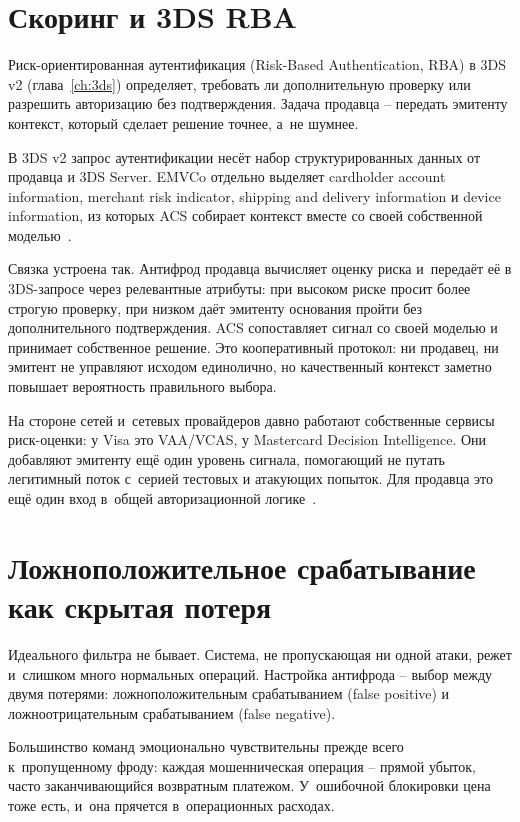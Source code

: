 \section{Скоринг и 3DS RBA}\label{sec:fraud-3ds-rba}

Риск-ориентированная аутентификация (Risk-Based Authentication, RBA)
в 3DS v2 (глава~\ref{ch:3ds}) определяет, требовать ли дополнительную
проверку или разрешить авторизацию без подтверждения. Задача
продавца -- передать эмитенту контекст, который сделает решение
точнее, а~не шумнее.

В 3DS v2 запрос аутентификации несёт набор структурированных данных
от продавца и 3DS Server.
EMVCo отдельно выделяет cardholder account information,
merchant risk indicator, shipping and delivery information
и device information, из которых ACS собирает контекст вместе
со своей собственной моделью~\cite{emvco-3ds,emvco-3ds-tech-features}.

Связка устроена так. Антифрод продавца вычисляет оценку риска
и~передаёт её в 3DS-запросе через релевантные атрибуты: при высоком
риске просит более строгую проверку, при низком даёт эмитенту
основания пройти без дополнительного подтверждения. ACS сопоставляет
сигнал со своей моделью и принимает собственное решение. Это
кооперативный протокол: ни продавец, ни эмитент не управляют исходом
единолично, но качественный контекст заметно повышает вероятность
правильного выбора.

На стороне сетей и~сетевых провайдеров давно работают собственные
сервисы риск-оценки: у Visa это VAA/VCAS, у Mastercard Decision
Intelligence. Они добавляют эмитенту ещё один уровень сигнала,
помогающий не путать легитимный поток с~серией тестовых и атакующих
попыток. Для продавца это ещё один вход в~общей авторизационной
логике~\cite{visa-auth-management-2020,mc-decision-intelligence}.

\section{Ложноположительное срабатывание как скрытая потеря}\label{sec:fraud-false-positive}

Идеального фильтра не бывает. Система, не пропускающая ни одной атаки,
режет и~слишком много нормальных операций. Настройка антифрода --
выбор между двумя потерями: ложноположительным срабатыванием (false
positive) и ложноотрицательным срабатыванием (false negative).

Большинство команд эмоционально чувствительны прежде всего
к~пропущенному фроду: каждая мошенническая операция -- прямой убыток,
часто заканчивающийся возвратным платежом. У~ошибочной блокировки цена тоже
есть, и~она прячется в~операционных расходах.

